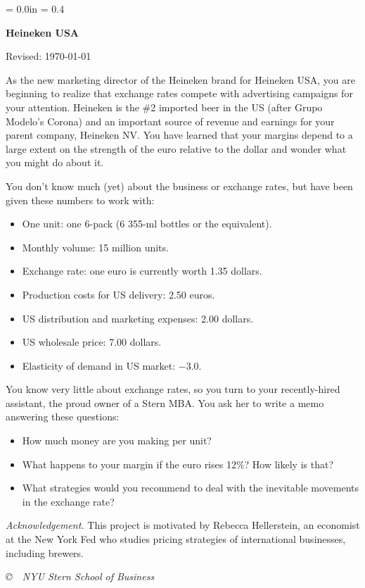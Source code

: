 \documentclass[letterpaper,12pt]{article}
\def\HeadName{Heineken USA}
\begin{document}
\parindent = 0.0in
\parskip = 0.4\bigskipamount
\thispagestyle{empty}%
\Head

\centerline{\large \bf \HeadName}%
\centerline{Revised:  \today}

\bigskip


\bigskip
As the new marketing director of the Heineken brand for Heineken USA,
you are beginning to realize that exchange rates compete with
advertising campaigns for your attention.
Heineken is the \#2 imported beer in the US
(after Grupo Modelo's Corona) and an important source of revenue and earnings
for your parent company, Heineken NV.
You have learned that your margins depend to a large extent on
the strength of the euro relative to the dollar
and wonder what you might do about it.

You don't know much (yet) about the business or exchange rates,
but have been given these numbers to work with:
\begin{itemize} \itemsep=0.01in \topsep=0.01in
\item One unit:  one 6-pack (6 355-ml bottles or the equivalent).
\item Monthly volume:  15 million units.
\item Exchange rate:  one euro is currently worth  1.35 dollars.
\item Production costs for US delivery:  2.50 euros.
\item US distribution and marketing expenses:  2.00 dollars.
\item US wholesale price:  7.00 dollars.
\item Elasticity of demand in US market:  $-3.0$.
\end{itemize}

You know very little about exchange rates,
so you turn to your recently-hired assistant,
the proud owner of a Stern MBA.
You ask her to write a memo answering these questions:
%
\begin{itemize} %
\item How much money are you making per unit?  %

\item What happens to your margin if the euro rises 12\%?
How likely is that?

\item What strategies would you recommend to deal with
the inevitable movements in the  exchange rate?
\end{itemize}

{\it Acknowledgement.\/}  This project is motivated by Rebecca Hellerstein,
an economist at the New York Fed who studies pricing strategies of international businesses, including brewers.


\vfill
\centerline{\it \copyright \ \number\year \ NYU Stern School of Business}
\end{document}
